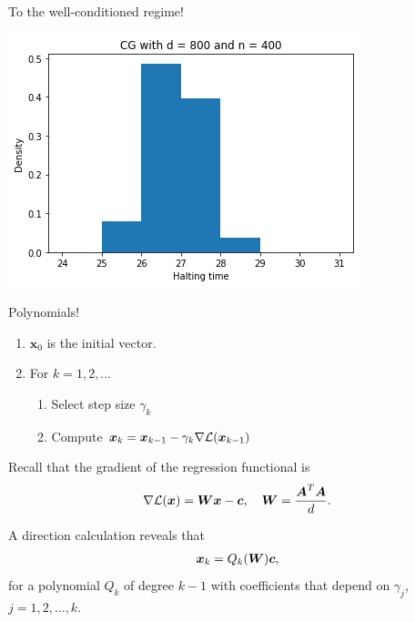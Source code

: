 \documentclass[9pt,aspectratio=169]{beamer}
\begin{document}
\begin{frame}{To the well-conditioned regime!}
\begin{center}
\includegraphics[width=.5\linewidth]{part-3-images/wellconditioned.png}
\end{center}


\end{frame}


\begin{frame}{Polynomials!}

\hspace{2in}
\begin{enumerate}
    \item $\boldsymbol x_0$ is the initial vector.
    \item For $k = 1,2,\ldots$
    \begin{enumerate}
        \item Select step size $\gamma_k$
        \item Compute ${\boldsymbol x}_k = {\boldsymbol x}_{k-1} - \gamma_k \nabla \mathcal L({\boldsymbol x}_{k-1})$
    \end{enumerate}
\end{enumerate}

\pause

Recall that the gradient of the regression functional is
\begin{align*}
    \nabla \mathcal L({\boldsymbol x})  = {\boldsymbol W} {\boldsymbol x} - {\boldsymbol c}, \quad {\boldsymbol W} = \frac{{\boldsymbol A}^T {\boldsymbol A}}{d}.
\end{align*}

\pause


A direction calculation reveals that
\begin{align*}
    {\boldsymbol x}_k = Q_k({\boldsymbol W}) {\boldsymbol c},
\end{align*}
for a polynomial $Q_k$ of degree $k-1$ with coefficients that depend on $\gamma_j$, $j =1,2,\ldots,k$. 

\end{frame}
\end{document}

